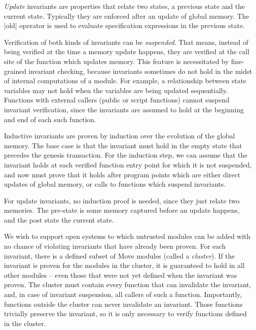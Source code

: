\emph{Update} invariants are properties that relate two states, a previous state
and the current state.  Typically they are enforced after an update of global
memory. The |old| operator is used to evaluate specification expressions in the
previous state.

Verification of both kinds of invariants can be \emph{suspended}. That means,
instead of being verified at the time a memory update happens, they are verified
at the call site of the function which updates memory. This feature is
necessitated by fine-grained invariant checking, because invariants sometimes do
not hold in the midst of internal computations of a module. For example, a
relationship between state variables may not hold when the variables are being
updated sequentially.  Functions with external callers (public or script
functions) cannot suspend invariant verification, since the invariants are
assumed to hold at the beginning and end of each such function.


Inductive invariants are proven by induction over the evolution of the global
memory. The base case is that the invariant must hold in the empty state that
precedes the genesis transaction.  For the induction step, we can assume that
the invariant holds at each verified function entry point for which it is not
suspended, and now must prove that it holds after program points which are
either direct updates of global memory, or calls to functions which suspend
invariants.

For update invariants, no induction proof is needed, since they just relate two
memories.  The pre-state is some memory captured before an update happens, and
the post state the current state.


We wish to support open systems to which untrusted modules can be added
with no chance of violating invariants that have already been proven. For each
invariant, there is a defined subset of Move modules (called a
\textit{cluster}). If the invariant is proven for the modules in the cluster, it
is guaranteed to hold in all other modules -- even those that were not yet
defined when the invariant was proven.  The cluster must contain every function
that can invalidate the invariant, and, in case of invariant suspension, all
callers of such a function.  Importantly, functions outside the cluster can
never invalidate an invariant. Those functions trivially preserve the
invariant, so it is only necessary to verify functions defined in the cluster.

